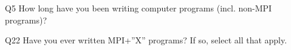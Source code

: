 \begin{description}%
\item{Q5} How long have you been writing computer programs (incl. non-MPI programs)?%
\item{Q22} Have you ever written MPI+”X” programs? If so, select all that apply.%
\end{description}%
